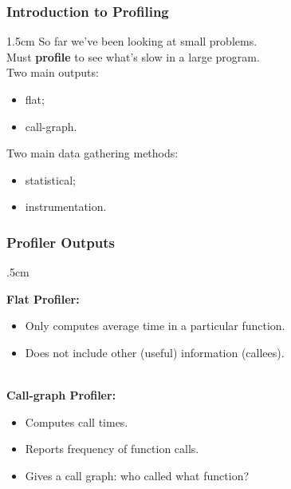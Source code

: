 \begin{frame}
  \frametitle{Introduction to Profiling}



\begin{changemargin}{1.5cm}
    So far we've been looking at small problems.\\[1em]
    Must {\bf profile} to see what's slow in a
      large program.\\[1em]
    Two main outputs:
      \begin{itemize}
        \item flat;
        \item call-graph.
      \end{itemize}



    Two main data gathering methods:
      \begin{itemize}
        \item statistical;
        \item instrumentation.
      \end{itemize}
   \end{changemargin}
\end{frame}

\begin{frame}
  \frametitle{Profiler Outputs}


\begin{changemargin}{.5cm}
  
  {\bf Flat Profiler:}

  \begin{itemize}
    \item Only computes average time in a particular function.
    \item Does not include other (useful) information (callees).
  \end{itemize}

~\\[1em]

  {\bf Call-graph Profiler:}

  \begin{itemize}
    \item Computes call times.
    \item Reports frequency of function calls.
    \item Gives a call graph: who called what function?
  \end{itemize}
  \end{changemargin}
\end{frame}

